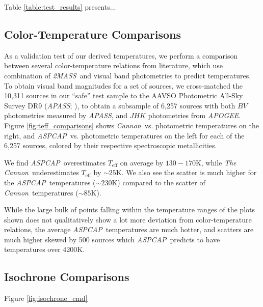 \documentclass[modern]{aastex62}
\newcommand{\apogee}{\textsl{APOGEE}}
\newcommand{\thecannon}{\textsl{The Cannon}}
\newcommand{\cannon}{\textsl{Cannon}}
\newcommand{\aspcap}{\textsl{ASPCAP}}
\newcommand{\zmass}{\textsl{2MASS}}
\newcommand{\teff}{T_{\mathrm{eff}}}
\begin{document}
Table \ref{table:test_results} presents...

\subsection{Color-Temperature Comparisons}

As a validation test of our derived temperatures, we perform a comparison between several color-temperature relations from literature, which use combination of \zmass\ and visual band photometries to predict temperatures. To obtain visual band magnitudes for a set of sources, we cross-matched the 10,311 sources in our ``safe'' test sample to the AAVSO Photometric All-Sky Survey DR9 (\textsl{APASS}; \citealt{Henden:2016}), to obtain a subsample of 6,257 sources with both $BV$ photometries measured by \textsl{APASS}, and $JHK$ photometries from \apogee. Figure \ref{fig:teff_comparisons} shows \cannon\ vs. photometric temperatures on the right, and \aspcap\ vs. photometric temperatures on the left for each of the 6,257 sources, colored by their respective spectroscopic metallicities.


We find \aspcap\ overestimates $\teff$ on average by $130-170$K, while \thecannon\ underestimates $\teff$ by $\sim25$K. We also see the scatter is much higher for the \aspcap\ temperatures ($\sim230$K) compared to the scatter of \cannon\ temperatures ($\sim85$K).

While the large bulk of points falling within the temperature ranges of the plots shown does not qualitatively show a lot more deviation from color-temperature relations, the average \aspcap\ temperatures are much hotter, and scatters are much higher skewed by 500 sources which \aspcap\ predicts to have temperatures over 4200K.

\subsection{Isochrone Comparisons}

Figure \ref{fig:isochrone_cmd}


\end{document}
